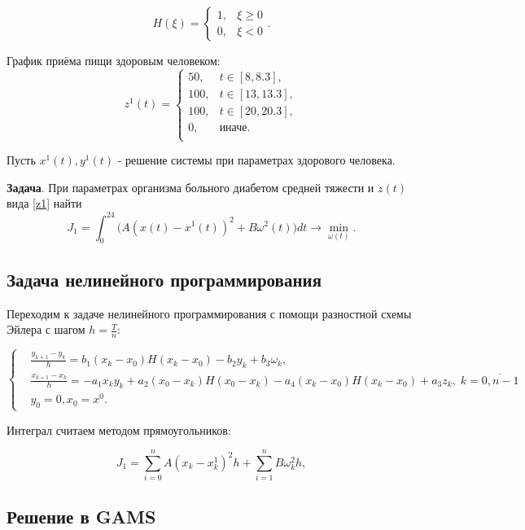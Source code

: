 \documentclass[14pt]{article}
\begin{document}
$$
H(\xi) = \begin{cases} 1, & \xi \ge 0 \\ 0, & \xi < 0 \end{cases}.
$$

График приёма пищи здоровым человеком:
\begin{equation}\label{z1}
z^1(t) = \begin{cases}
           50,& t \in [8, 8.3], \\
           100 , & t \in [13, 13.3], \\
           100 , & t \in [20,20.3],\\
           0, & \mbox{иначе}. \\
\end{cases}
\end{equation}

Пусть $ x^1(t), y^1(t) $ - решение системы при параметрах здорового человека.

\textbf{Задача}. При параметрах организма больного диабетом средней тяжести и  $z(t)$ вида \eqref{z1} найти
$$
J_1 = \int_0^{24} \Big( A(x(t)-x^1(t))^2 + B\omega^2(t)\Big) dt \rightarrow \min_{\omega(t)}.
$$

\subsection{Задача нелинейного программирования}

Переходим к задаче нелинейного программирования с помощи разностной схемы Эйлера с шагом $h=\frac{T}{n}$:

\begin{equation}\label{NLP1}
\left\{ \begin{aligned}
& \frac{y_{k+1}-y_k}{h} = b_1(x_k-x_0)H(x_k-x_0) - b_2 y_k+b_{3}\omega_k, \\
& \frac{x_{k+1}-x_k}{h} = - a_{1}x_k y_k+a_2(x_0-x_k)H(x_0-x_k)-a_4(x_k-x_0)H(x_k-x_0)+a_3 z_k,\; k = \overline{0,n-1} \\
& y_0 = 0 , x_0 = x^0.
\end{aligned}\right.
\end{equation}

Интеграл считаем методом прямоугольников:

$$
    J_1 =\sum_{i=0}^n A(x_k-x_k^1)^2 h + \sum_{i=1}^n B\omega_k^2 h,
$$


\subsection{Решение в GAMS}
\end{document}

